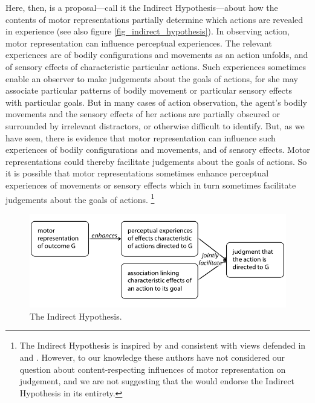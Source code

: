 \documentclass[12pt,\papersize]{extarticle}
\begin{document}
Here, then, is a proposal---call it the Indirect Hypothesis---about how the contents of motor representations partially determine which actions are revealed in experience (see also figure \vref{fig_indirect_hypothesis}).  In observing action, motor representation can influence perceptual experiences.  The relevant experiences are of bodily configurations and movements as an action unfolds, and of sensory effects of characteristic particular actions.  Such experiences sometimes enable an observer to make judgements about the goals of actions, for she may associate particular patterns of bodily movement or particular sensory effects with particular goals.  But in many cases of action observation, the agent's bodily movements and the sensory effects of her actions are partially obscured or surrounded by irrelevant distractors, or otherwise difficult to identify.  But, as we have seen, there is evidence that motor representation can influence such experiences of bodily configurations and movements, and of sensory effects.  Motor representations could thereby facilitate judgements about the goals of actions.  So it is possible that motor representations sometimes enhance perceptual experiences of movements or sensory effects which in turn sometimes facilitate judgements about the goals of actions.%
\footnote{
The Indirect Hypothesis is inspired by and consistent with views defended in \citet{Csibra:2007fy} and \citet{Wilson:2005qu}.  However, to our knowledge these authors have not considered  our question about content-respecting influences of motor representation on judgement, and we are not suggesting that the would endorse the Indirect Hypothesis in its entirety.  
}
   

\begin{figure}
\begin{center}
\includegraphics[width=\textwidth]{fig_indirect_hypothesis.png}
\caption{
\label{fig_indirect_hypothesis}
	The Indirect Hypothesis.
}
\end{center}
\end{figure}
\end{document}
